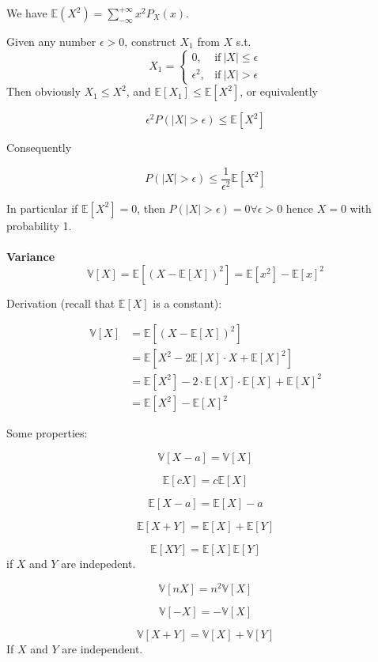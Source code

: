\documentclass{article}
\begin{document}
We have $\mathbb{E}(X^2) = \sum_{-\infty}^{+\infty}{ x^2 P_{X}(x)}$.

Given any number $\epsilon > 0$, construct $X_1$ from $X$ s.t.
$$
X_1 =
\begin{cases}
0, & \text{if}~|X| \leq \epsilon \\
\epsilon^2, & \text{if}~|X| > \epsilon
\end{cases}
$$
Then obviously $X_1 \leq X^2$, and $\mathbb{E}[X_1] \leq \mathbb{E}[X^2]$, or equivalently

$$
\epsilon^2 P(|X| > \epsilon) \leq \mathbb{E}[X^2]
$$

Consequently

$$
P(|X| > \epsilon) \leq \frac{1}{\epsilon^2} \mathbb{E}[X^2]
$$

In particular if $\mathbb{E}[X^2] = 0$, then $P(|X| > \epsilon) = 0 \forall \epsilon > 0$ hence $X = 0$ with probability 1.
\\
\\
\textbf{Variance}
$$
\mathbb{V}[X] = \mathbb{E}[(X - \mathbb{E}[X])^2] = \mathbb{E}[x^2] - \mathbb{E}[x]^2
$$

Derivation (recall that $\mathbb{E}[X]$ is a constant):

\begin{align*}
\mathbb{V}[X] &= \mathbb{E}[(X - \mathbb{E}[X])^2] \\
              &= \mathbb{E}[X^2 - 2 \mathbb{E}[X] \cdot X + \mathbb{E}[X]^2] \\
              &= \mathbb{E}[X^2] - 2 \cdot \mathbb{E}[X] \cdot \mathbb{E}[X] + \mathbb{E}[X]^2 \\
              &= \mathbb{E}[X^2] - \mathbb{E}[X]^2
\end{align*}

Some properties:

$$
\mathbb{V}[X - a] = \mathbb{V}[X]
$$

$$
\mathbb{E}[cX] = c\mathbb{E}[X]
$$

$$
\mathbb{E}[X - a] = \mathbb{E}[X] - a
$$

$$
\mathbb{E}[X + Y] = \mathbb{E}[X] + \mathbb{E}[Y]
$$

$$
\mathbb{E}[X Y] = \mathbb{E}[X] \mathbb{E}[Y]
$$
if $X$ and $Y$ are indepedent.

$$
\mathbb{V}[nX] = n^2 \mathbb{V}[X]
$$

$$
\mathbb{V}[-X] = - \mathbb{V}[X]
$$

$$
\mathbb{V}[X + Y] = \mathbb{V}[X] + \mathbb{V}[Y]
$$
If $X$ and $Y$ are independent.
\end{document}
